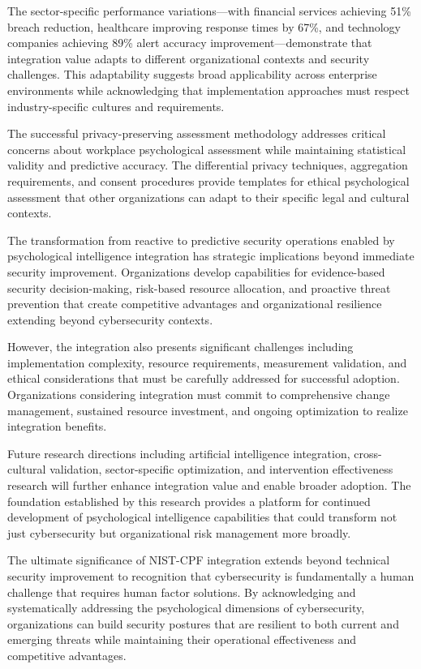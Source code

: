 \documentclass[10pt, twocolumn]{article}
\begin{document}
The sector-specific performance variations—with financial services achieving 51\% breach reduction, healthcare improving response times by 67\%, and technology companies achieving 89\% alert accuracy improvement—demonstrate that integration value adapts to different organizational contexts and security challenges. This adaptability suggests broad applicability across enterprise environments while acknowledging that implementation approaches must respect industry-specific cultures and requirements.

The successful privacy-preserving assessment methodology addresses critical concerns about workplace psychological assessment while maintaining statistical validity and predictive accuracy. The differential privacy techniques, aggregation requirements, and consent procedures provide templates for ethical psychological assessment that other organizations can adapt to their specific legal and cultural contexts.

The transformation from reactive to predictive security operations enabled by psychological intelligence integration has strategic implications beyond immediate security improvement. Organizations develop capabilities for evidence-based security decision-making, risk-based resource allocation, and proactive threat prevention that create competitive advantages and organizational resilience extending beyond cybersecurity contexts.

However, the integration also presents significant challenges including implementation complexity, resource requirements, measurement validation, and ethical considerations that must be carefully addressed for successful adoption. Organizations considering integration must commit to comprehensive change management, sustained resource investment, and ongoing optimization to realize integration benefits.

Future research directions including artificial intelligence integration, cross-cultural validation, sector-specific optimization, and intervention effectiveness research will further enhance integration value and enable broader adoption. The foundation established by this research provides a platform for continued development of psychological intelligence capabilities that could transform not just cybersecurity but organizational risk management more broadly.

The ultimate significance of NIST-CPF integration extends beyond technical security improvement to recognition that cybersecurity is fundamentally a human challenge that requires human factor solutions. By acknowledging and systematically addressing the psychological dimensions of cybersecurity, organizations can build security postures that are resilient to both current and emerging threats while maintaining their operational effectiveness and competitive advantages.
\end{document}

